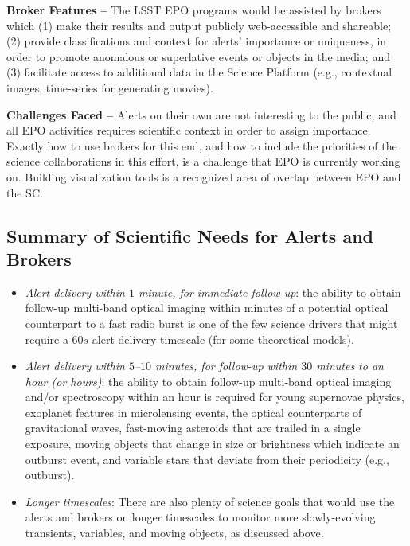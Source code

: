 {\bf Broker Features --}
The LSST EPO programs would be assisted by brokers which
(1) make their results and output publicly web-accessible and shareable;
(2) provide classifications and context for alerts' importance or uniqueness, in order to promote anomalous or superlative events or objects in the media; and
(3) facilitate access to additional data in the Science Platform (e.g., contextual images, time-series for generating movies).

{\bf Challenges Faced --}
Alerts on their own are not interesting to the public, and all EPO activities requires scientific context in order to assign importance.
Exactly how to use brokers for this end, and how to include the priorities of the science collaborations in this effort, is a challenge that EPO is currently working on.
Building visualization tools is a recognized area of overlap between EPO and the SC.

\subsection{Summary of Scientific Needs for Alerts and Brokers}
\label{ssec:sci_sum}

\medskip
{}
\begin{itemize}
\item {\it Alert delivery within $1$ minute, for immediate follow-up}: the ability to obtain follow-up multi-band optical imaging within minutes of a potential optical counterpart to a fast radio burst is one of the few science drivers that might require a $60s$ alert delivery timescale (for some theoretical models).
\item {\it Alert delivery within $5$--$10$ minutes, for follow-up within $30$ minutes to an hour (or hours)}: the ability to obtain follow-up multi-band optical imaging and/or spectroscopy within an hour is required for young supernovae physics, exoplanet features in microlensing events, the optical counterparts of gravitational waves, fast-moving asteroids that are trailed in a single exposure, moving objects that change in size or brightness which indicate an outburst event, and variable stars that deviate from their periodicity (e.g., outburst).
\item {\it Longer timescales}: There are also plenty of science goals that would use the alerts and brokers on longer timescales to monitor more slowly-evolving transients, variables, and moving objects, as discussed above.
\end{itemize}

